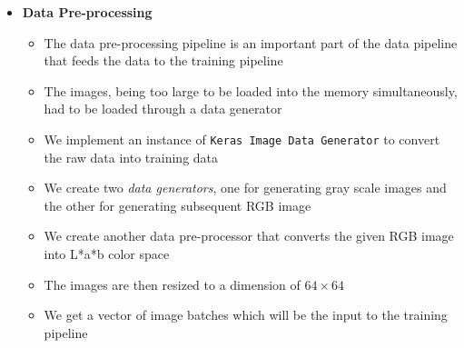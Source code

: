 \documentclass[oneside,a4paper,12pt]{report}
\begin{document}
\begin{itemize}
	\item \textbf{Data Pre-processing}
	\begin{itemize}
		\item The data pre-processing pipeline is an important part of the data pipeline that feeds the data to the training pipeline
		\item The images, being too large to be loaded into the memory simultaneously, had to be loaded through a data generator
		\item We implement an instance of \texttt{Keras Image Data Generator} to convert the raw data into training data
		\item We create two \textit{data generators}, one for generating gray scale images and the other for generating subsequent RGB image
		\item We create another data pre-processor that converts the given RGB image into L*a*b color space
		\item The images are then resized to a dimension of $64 \times 64$ 
		\item We get a vector of image batches which will be the input to the training pipeline
	\end{itemize}
	

\end{itemize}
\end{document}
